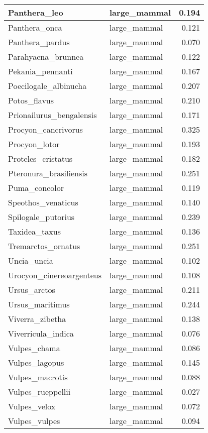 \begin{table}
\begin{tabular}[t]{l|l|r}
\hline
Panthera\_leo & large\_mammal & 0.194\\
\hline
Panthera\_onca & large\_mammal & 0.121\\
\hline
Panthera\_pardus & large\_mammal & 0.070\\
\hline
Parahyaena\_brunnea & large\_mammal & 0.122\\
\hline
Pekania\_pennanti & large\_mammal & 0.167\\
\hline
Poecilogale\_albinucha & large\_mammal & 0.207\\
\hline
Potos\_flavus & large\_mammal & 0.210\\
\hline
Prionailurus\_bengalensis & large\_mammal & 0.171\\
\hline
Procyon\_cancrivorus & large\_mammal & 0.325\\
\hline
Procyon\_lotor & large\_mammal & 0.193\\
\hline
Proteles\_cristatus & large\_mammal & 0.182\\
\hline
Pteronura\_brasiliensis & large\_mammal & 0.251\\
\hline
Puma\_concolor & large\_mammal & 0.119\\
\hline
Speothos\_venaticus & large\_mammal & 0.140\\
\hline
Spilogale\_putorius & large\_mammal & 0.239\\
\hline
Taxidea\_taxus & large\_mammal & 0.136\\
\hline
Tremarctos\_ornatus & large\_mammal & 0.251\\
\hline
Uncia\_uncia & large\_mammal & 0.102\\
\hline
Urocyon\_cinereoargenteus & large\_mammal & 0.108\\
\hline
Ursus\_arctos & large\_mammal & 0.211\\
\hline
Ursus\_maritimus & large\_mammal & 0.244\\
\hline
Viverra\_zibetha & large\_mammal & 0.138\\
\hline
Viverricula\_indica & large\_mammal & 0.076\\
\hline
Vulpes\_chama & large\_mammal & 0.086\\
\hline
Vulpes\_lagopus & large\_mammal & 0.145\\
\hline
Vulpes\_macrotis & large\_mammal & 0.088\\
\hline
Vulpes\_rueppellii & large\_mammal & 0.027\\
\hline
Vulpes\_velox & large\_mammal & 0.072\\
\hline
Vulpes\_vulpes & large\_mammal & 0.094\\

\end{tabular}
\end{table}
